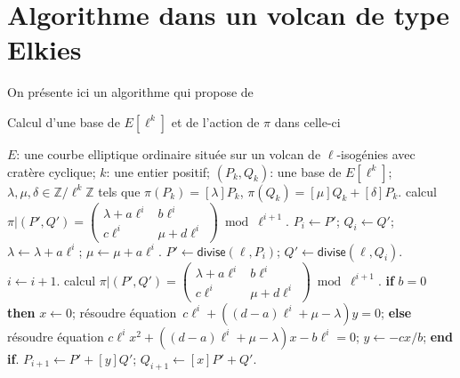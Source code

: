 \documentclass[10pt,a4paper]{book}
\theoremstyle{plain}
\theoremstyle{definition}
\theoremstyle{definition}
\theoremstyle{definition}
\theoremstyle{definition}
\theoremstyle{remark}
\theoremstyle{remark}
\theoremstyle{definition}
\begin{document}
\section{Algorithme dans un volcan de type Elkies}
On présente ici un algorithme qui propose de 
\begin{algorithm}
\caption{\label{alg:app:bas:fro}Calcul d'une base de $E[\ell^k]$ et de l'action de $\pi$ dans celle-ci}
\begin{algorithmic}[1]
\REQUIRE $E$: une courbe elliptique ordinaire située sur un volcan de $\ell$-isogénies avec cratère cyclique;
$k$: une entier positif;
\ENSURE $(P_k, Q_k )$: une base de $E[\ell^k]$;
$\lambda, \mu, \delta \in \mathbb{Z}/\ell^k \mathbb{Z}$
tels que $\pi(P_k)= [\lambda] P_k$, $ \pi(Q_k)= [\mu] Q_k + [\delta] P_k$.
\STATE calcul $\pi|(P',Q')=\left( \begin{smallmatrix}
\lambda + a\ell^{i} & b\ell^{i}\\
c\ell^{i} & \mu + d\ell^{i} \end{smallmatrix} \right) \bmod {\ell^{i+1}}.$
\STATE $P_i \leftarrow P'$; $Q_i \leftarrow Q'$; $\lambda \leftarrow \lambda+a \ell^i$; $\mu \leftarrow \mu +a \ell^i$.
\STATE\label{alg:fin:identical:divide}
  $P' \leftarrow \mathsf{divise}(\ell, P_{i})$; $Q' \leftarrow \mathsf{divise} (\ell, Q_{i})$.
\STATE $i \leftarrow i+1$.
\STATE calcul $\pi|(P',Q')=\left( \begin{smallmatrix}
\lambda + a\ell^{i} & b\ell^{i}\\
c\ell^{i} & \mu + d\ell^{i} \end{smallmatrix} \right) \bmod {\ell^{i+1}}.$
\ENDWHILE 
{}
\STATE\label{alg:app:diagonal:solve1}
  \textbf{if} $b = 0$ \textbf{then} $x \leftarrow 0$;
  résoudre équation~$c \ell^{i} + ((d-a) \ell^{i} + \mu-\lambda) y = 0$;
\STATE\label{alg:app:diagonal:solve2}
  \textbf{else} résoudre équation
  $c \ell^{i} x^2 + ((d-a) \ell^{i}+ \mu-\lambda) x - b \ell^{i} = 0$;
  $y \leftarrow -cx/b$; \textbf{end if}.
\STATE\label{alg:app:diagonal:upd-P}
  $P_{i+1} \leftarrow P' + [y] Q'$; $Q_{i+1} \leftarrow [x] P' + Q'$.

\end{algorithmic}
\end{algorithm}
\end{document}
